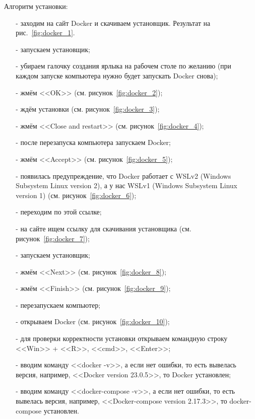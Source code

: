 Алгоритм установки:
\begin{enumerate}
    \item[-] заходим на сайт Docker и скачиваем установщик. Результат на рис.~\ref{fig:docker_1}.
    \item[-] запускаем установщик;
    \item[-] убираем галочку создания ярлыка на рабочем столе по желанию (при каждом запуске компьютера нужно будет запускать Docker снова);
    \item[-] жмём <<OK>> (см. рисунок~\ref{fig:docker_2});
    \item[-] ждём установки (см. рисунок~\ref{fig:docker_3});
    \item[-] жмём <<Close and restart>> (см. рисунок~\ref{fig:docker_4});
    \item[-] после перезапуска компьютера запускаем Docker;
    \item[-] жмём <<Accept>> (см. рисунок~\ref{fig:docker_5});
    \item[-] появилась предупреждение, что Docker работает с WSLv2 (Windows Subsystem Linux version 2), а у нас WSLv1 (Windows Subsystem Linux version 1) (см. рисунок~\ref{fig:docker_6});
    \item[-] переходим по этой ссылке;
    \item[-] на сайте ищем ссылку для скачивания установщика (см. рисунок~\ref{fig:docker_7});
    \item[-] запускаем установщик;
    \item[-] жмём <<Next>> (см. рисунок~\ref{fig:docker_8});
    \item[-] жмём <<Finish>> (см. рисунок~\ref{fig:docker_9});
    \item[-] перезапускаем компьютер;
    \item[-] открываем Docker (см. рисунок~\ref{fig:docker_10});
    \item[-] для проверки корректности установки открываем командную строку <<Win>> + <<R>>, <<cmd>>, <<Enter>>;
    \item[-] вводим команду <<docker -v>>, а если нет ошибки, то есть вывелась версия, например, <<Docker version 23.0.5>>, то Docker установлен;
    \item[-] вводим команду <<docker-compose -v>>, а если нет ошибки, то есть вывелась версия, например, <<Docker-compose version 2.17.3>>, то docker-compose установлен.
\end{enumerate}

